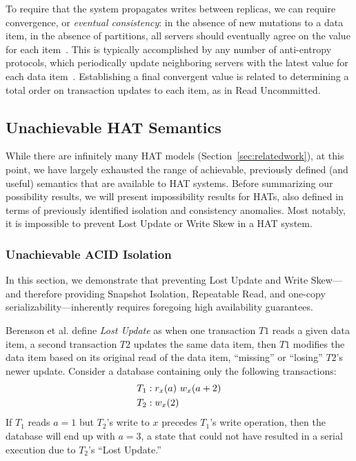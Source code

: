 
\vspace{.5em} To require that the
system propagates writes between replicas, we can require convergence,
or \textit{eventual consistency}: in the absence of new mutations to a
data item, in the absence of partitions, all servers should eventually
agree on the value for each item~\cite{cac, vogels-defs}. This is
typically accomplished by any number of anti-entropy protocols, which
periodically update neighboring servers with the latest value for each
data item~\cite{antientropy}. Establishing a final convergent value is
related to determining a total order on transaction updates to each
item, as in Read Uncommitted.

\subsection{Unachievable HAT Semantics}
\label{sec:unachievable-hat}

While there are infinitely many HAT models
(Section~\ref{sec:relatedwork}), at this point, we have largely
exhausted the range of achievable, previously defined (and useful)
semantics that are available to HAT systems. Before summarizing our
possibility results, we will present impossibility results for HATs,
also defined in terms of previously identified isolation and
consistency anomalies. Most notably, it is impossible to
prevent Lost Update or Write Skew in a HAT system.

\subsubsection{Unachievable ACID Isolation}
\label{sec:unachievable-acid}

In this section, we demonstrate that preventing Lost Update and Write
Skew---and therefore providing Snapshot Isolation, Repeatable Read,
and one-copy serializability---inherently requires foregoing high
availability guarantees.

Berenson et al. define \textit{Lost Update} as when one
transaction $T1$ reads a given data item, a second transaction $T2$
updates the same data item, then $T1$ modifies the data item based on
its original read of the data item, ``missing'' or ``losing'' $T2$'s
newer update. Consider a database containing only the following
transactions:
\begin{align*}
\small\vspace{-1em}
T_1 &: r_x(a)~w_x(a+2)
\\T_2 &: w_x(2)\vspace{-1em}
\end{align*}
If $T_1$ reads $a=1$ but $T_2$'s write to $x$ precedes $T_1$'s write
operation, then the database will end up with $a=3$, a state that
could not have resulted in a serial execution due to $T_2$'s
``Lost Update.''


